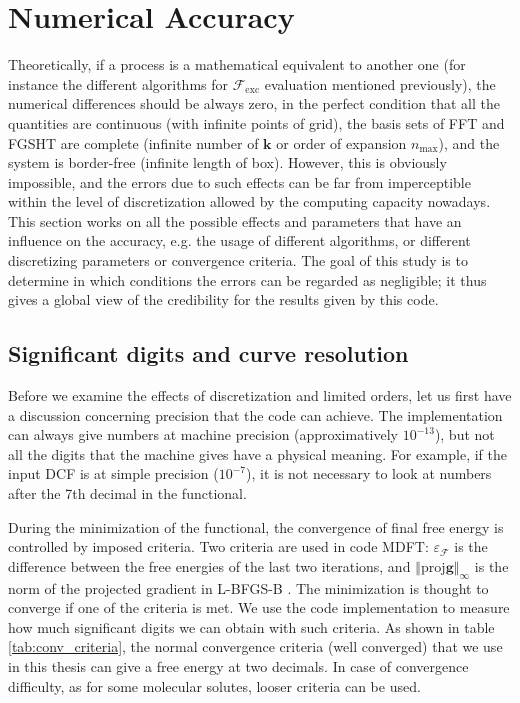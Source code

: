 
\chapter{Numerical Accuracy\label{chpt:accuracy}}

Theoretically, if a process is a mathematical equivalent to another
one (for instance the different algorithms for $\mathcal{F}_{\mathrm{exc}}$
evaluation mentioned previously), the numerical differences should
be always zero, in the perfect condition that all the quantities are
continuous (with infinite points of grid), the basis sets of \acs{FFT}
and \acs{FGSHT} are complete (infinite number of $\mathbf{k}$ or
order of expansion $n_{\max}$), and the system is border-free (infinite
length of box). However, this is obviously impossible, and the errors
due to such effects can be far from imperceptible within the level
of discretization allowed by the computing capacity nowadays. This
section works on all the possible effects and parameters that have
an influence on the accuracy, e.g. the usage of different algorithms,
or different discretizing parameters or convergence criteria. The
goal of this study is to determine in which conditions the errors
can be regarded as negligible; it thus gives a global view of the
credibility for the results given by this code.

\section{Significant digits and curve resolution}

Before we examine the effects of discretization and limited orders,
let us first have a discussion concerning precision that the code can achieve.
The implementation can always give numbers at machine precision (approximatively
$10^{-13}$), but not all the digits that the machine gives have a
physical meaning. For example, if the input \acs{DCF} is at simple
precision ($10^{-7}$), it is not necessary to look at numbers after
the 7th decimal in the functional. 

During the minimization of the functional, the convergence of final
free energy is controlled by imposed criteria. Two criteria are used
in code MDFT: $\varepsilon_{\mathcal{F}}$ is the difference between
the free energies of the last two iterations, and $\left\Vert \mathrm{proj}\mathbf{g}\right\Vert _{\infty}$
is the norm of the projected gradient in L-BFGS-B \citep{Zhu_1994_bfgs,Zhu_bfgs_1997_algorithm}.
The minimization is thought to converge if one of the criteria is
met. We use the code implementation to measure how much significant
digits we can obtain with such criteria. As shown in table \ref{tab:conv_criteria},
the normal convergence criteria (well converged) that we use in this
thesis can give a free energy at two decimals. In case of convergence
difficulty, as for some molecular solutes, looser criteria can be
used.

